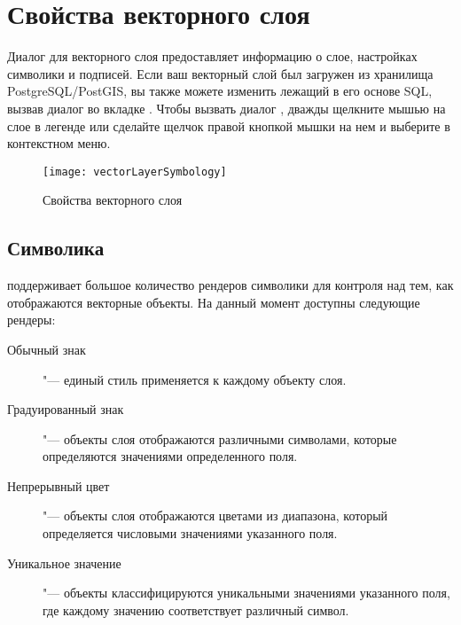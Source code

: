 \section{Свойства векторного слоя}\label{sec:vectorprops}

Диалог  для векторного слоя предоставляет информацию
о слое, настройках символики и подписей. Если ваш векторный слой был загружен
из хранилища PostgreSQL/PostGIS, вы также можете изменить лежащий в его
основе SQL, вызвав диалог  во вкладке .
Чтобы вызвать диалог , дважды щелкните мышью на слое в
легенде или сделайте щелчок правой кнопкой мышки на нем и выберите
 в контекстном меню.

\begin{figure}[ht]
   \centering
   \texttt{[image: vectorLayerSymbology]}
   \caption{Свойства векторного слоя \wincaption}\label{fig:vector_symbology}
 \end{figure}

\subsection{Символика}\label{sec:symbology}

\qg поддерживает большое количество рендеров символики для контроля над тем,
как отображаются векторные объекты. На данный момент доступны следующие
рендеры:

\begin{description}
    \item[Обычный знак] "--- единый стиль применяется к каждому
    объекту слоя.
    \item[Градуированный знак] "--- объекты слоя
    отображаются различными символами, которые определяются значениями
    определенного поля.
    \item[Непрерывный цвет] "--- объекты слоя отображаются цветами из
    диапазона, который определяется числовыми значениями указанного поля.
    \item[Уникальное значение] "--- объекты классифицируются уникальными
    значениями указанного поля, где каждому значению соответствует
    различный символ.
\end{description}

